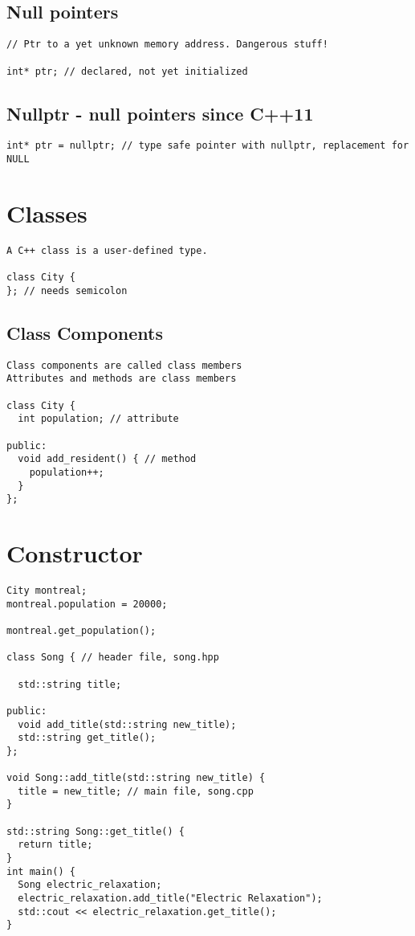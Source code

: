 \documentclass[openany]{report}
\begin{document}
\subsection{Null pointers}

\begin{verbatim}
// Ptr to a yet unknown memory address. Dangerous stuff!

int* ptr; // declared, not yet initialized
\end{verbatim}

\subsection{Nullptr - null pointers since C++11}

\begin{verbatim}
int* ptr = nullptr; // type safe pointer with nullptr, replacement for NULL
\end{verbatim}

\section{Classes}

\begin{verbatim}
A C++ class is a user-defined type.

class City {
}; // needs semicolon
\end{verbatim}

\subsection{Class Components}

\begin{verbatim}
Class components are called class members
Attributes and methods are class members

class City {
  int population; // attribute
 
public:
  void add_resident() { // method
    population++;
  }
};
\end{verbatim}

\section{Constructor}

\begin{verbatim}
City montreal;
montreal.population = 20000;

montreal.get_population();

class Song { // header file, song.hpp

  std::string title;

public:
  void add_title(std::string new_title);
  std::string get_title();
};

void Song::add_title(std::string new_title) {
  title = new_title; // main file, song.cpp
}

std::string Song::get_title() {
  return title;
}
int main() {
  Song electric_relaxation;
  electric_relaxation.add_title("Electric Relaxation");
  std::cout << electric_relaxation.get_title();
}
\end{verbatim}
\end{document}
